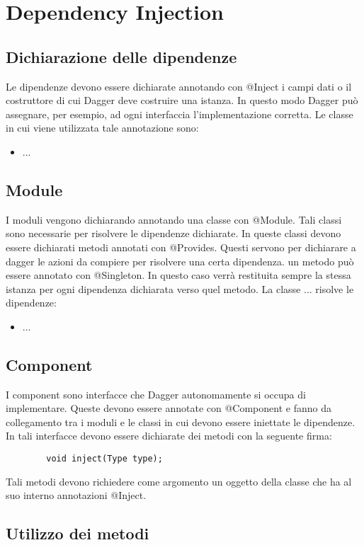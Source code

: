 \documentclass[../ManualeSviluppatore.tex]{subfiles}
\begin{document}
\section{Dependency Injection}
	\subsection{Dichiarazione delle dipendenze}
	Le dipendenze devono essere dichiarate annotando con @Inject i campi dati o il costruttore di cui Dagger deve costruire una istanza. In questo modo Dagger può assegnare, per esempio, ad ogni interfaccia l'implementazione corretta. Le classe in cui viene utilizzata tale annotazione sono:
	\begin{itemize}
		\item...
	\end{itemize}

	\subsection{Module}
	I moduli vengono dichiarando annotando una classe con @Module. Tali classi sono necessarie per risolvere le dipendenze dichiarate. In queste classi devono essere dichiarati metodi annotati con @Provides. Questi servono per dichiarare a dagger le azioni da compiere per risolvere una certa dipendenza. un metodo può essere annotato con @Singleton. In questo caso verrà restituita sempre la stessa istanza per ogni dipendenza dichiarata verso quel metodo. 
	La classe ... risolve le dipendenze:
	\begin{itemize}
		\item...
	\end{itemize}
	
	\subsection{Component}
	I component sono interfacce che Dagger autonomamente si occupa di implementare. Queste devono essere annotate con @Component e fanno da collegamento tra i moduli e le classi in cui devono essere iniettate le dipendenze. In tali interfacce devono essere dichiarate dei metodi con la seguente firma:
	\begin{lstlisting}
		void inject(Type type);
	\end{lstlisting}
	Tali metodi devono richiedere come argomento un oggetto della classe che ha al suo interno annotazioni @Inject.

	\subsection{Utilizzo dei metodi }
\end{document}
